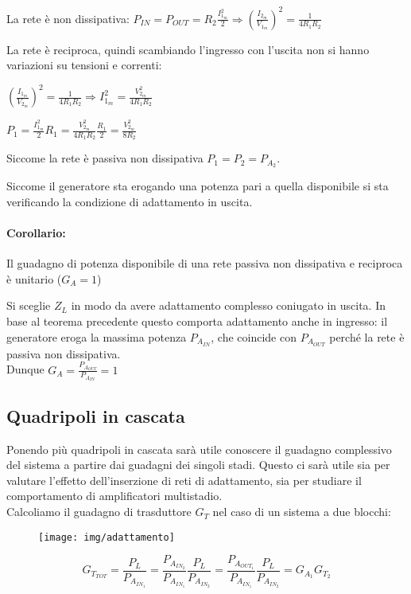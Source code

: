 La rete è non dissipativa:
$P_{IN} = P_{OUT} = R_2 \frac{I_{1_m}^2}{2}
\Rightarrow \left( \frac{I_{2_m}}{V_{1_m}} \right) ^2 = \frac{1}{4 R_1 R_2}$

La rete è reciproca, quindi scambiando l'ingresso con l'uscita non si hanno variazioni su tensioni e correnti:

$\left( \frac{I_{1_m}}{V_{2_m}} \right) ^2 = \frac{1}{4 R_1 R_2} \Rightarrow
I_{1_m}^2 = \frac{V_{2_m}^2}{4 R_1 R_2}$

$P_1 = \frac{I_{1_m}^2}{2} R_1 = \frac{V_{2_m}^2}{4 R_1 R_2} \frac{R_1}{2} = \frac{V_{2_m}^2}{8R_2}$

Siccome la rete è passiva non dissipativa $P_1 = P_2 = P_{A_2}$.

Siccome il generatore sta erogando una potenza pari a quella disponibile si sta verificando la condizione di adattamento in uscita.

\paragraph{Corollario:} Il guadagno di potenza disponibile di una rete passiva non dissipativa e reciproca è unitario ($G_A = 1$)

Si sceglie $Z_L$ in modo da avere adattamento complesso coniugato in uscita. In base al teorema precedente questo comporta adattamento anche in ingresso: il generatore eroga la massima potenza $P_{A_{IN}}$, che coincide con $P_{A_{OUT}}$ perché la rete è passiva non dissipativa.\\
Dunque $G_A = \frac{P_{A_{OUT}}}{P_{A_{IN}}} = 1$

\subsection{Quadripoli in cascata}
Ponendo più quadripoli in cascata sarà utile conoscere il guadagno complessivo del sistema a partire dai guadagni dei singoli stadi. Questo ci sarà utile sia per valutare l'effetto dell'inserzione di reti di adattamento, sia per studiare il comportamento di amplificatori multistadio.
\\
Calcoliamo il guadagno di trasduttore $G_T$ nel caso di un sistema a due blocchi:

\begin{figure}[hbt]
	\centering
	\texttt{[image: img/adattamento]}
	\caption{}
	\label{fig:adatttamento}
\end{figure}


\[
G_{T_{TOT}} = \frac{P_L}{P_{A_{IN_1}}}=
\frac{P_{A_{IN_2}}}{P_{A_{IN_1}}}
\frac{P_L}{P_{A_{IN_2}}} =
\frac{P_{A_{OUT_1}}}{P_{A_{IN_1}}}
\frac{P_L}{P_{A_{IN_2}}}
=
G_{A_1} G_{T_2}
\]

